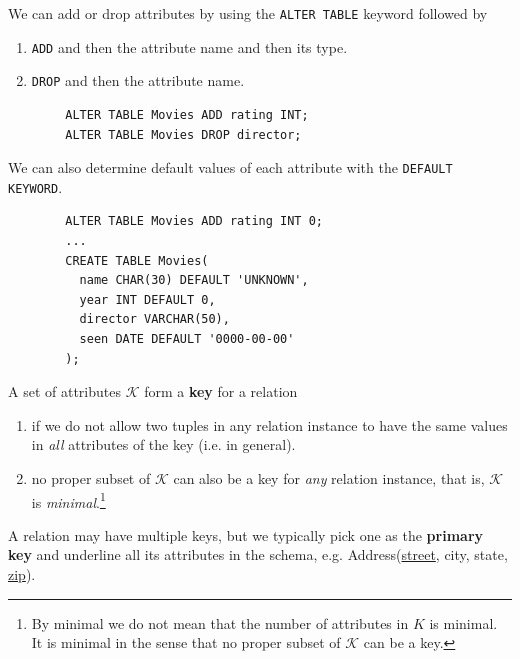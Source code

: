 \documentclass{article}
\begin{document}
    \begin{theorem}
      We can add or drop attributes by using the \texttt{ALTER TABLE} keyword followed by 
      \begin{enumerate}
        \item \texttt{ADD} and then the attribute name and then its type. 
        \item \texttt{DROP} and then the attribute name. 
      \end{enumerate}
      \begin{lstlisting}
        ALTER TABLE Movies ADD rating INT; 
        ALTER TABLE Movies DROP director; 
      \end{lstlisting}
    \end{theorem}

    \begin{theorem}
      We can also determine default values of each attribute with the \texttt{DEFAULT KEYWORD}. 
      \begin{lstlisting}
        ALTER TABLE Movies ADD rating INT 0; 
        ...
        CREATE TABLE Movies(
          name CHAR(30) DEFAULT 'UNKNOWN', 
          year INT DEFAULT 0, 
          director VARCHAR(50), 
          seen DATE DEFAULT '0000-00-00'
        ); 
      \end{lstlisting}
      
    \end{theorem}

    \begin{definition}[Key]
      A set of attributes $\mathcal{K}$ form a \textbf{key} for a relation 
      \begin{enumerate}
        \item if we do not allow two tuples in any relation instance to have the same values in \textit{all} attributes of the key (i.e. in general). 
        \item no proper subset of $\mathcal{K}$ can also be a key for \textit{any} relation instance, that is, $\mathcal{K}$ is \textit{minimal}.\footnote{By minimal we do not mean that the number of attributes in $K$ is minimal. It is minimal in the sense that no proper subset of $\mathcal{K}$ can be a key.}
      \end{enumerate}
      A relation may have multiple keys, but we typically pick one as the \textbf{primary key} and underline all its attributes in the schema, e.g. Address(\underline{street}, city, state, \underline{zip}). 
    \end{definition}
\end{document}
